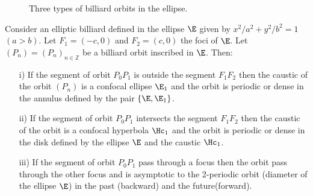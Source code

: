  \begin{figure}
	\begin{center}
		\def\svgwidth{1.0\textwidth}
		
		\caption{Three types of billiard orbits in the ellipse.}
	\end{center}
\label{fig:caustic1}
\end{figure} 
 
 \begin{theorem}
 Consider an  elliptic billiard defined  in the ellipse $\E$ given by $x^2/a^2+y^2/b^2=1$ $(a>b)$. Let $F_1=(-c,0)$ and $F_2=(c,0) $ the foci of $\E$. Let $(P_n)=(P_n)_{n\in\mathbb{Z}}$ be a billiard orbit inscribed in $\E$. Then:
 
 \begin{itemize} 
 \item[i)] If the segment of orbit $P_0P_1$ is outside the segment $F_1F_2$ then the caustic of the orbit $(P_n)$ is a confocal ellipse $\E_1$ and the orbit is periodic or dense in the annulus defined by the pair  $\{\E,   \E_1 \}$.
 
  \item[ii)] If the segment of orbit $P_0P_1$   intersects the segment $F_1F_2$ then the caustic of the orbit is a confocal hyperbola  $\Hc_1$ and the orbit is periodic or dense in the disk defined by the ellipse $\E$ and the caustic $\Hc_1$.
  
   \item[iii)] If the segment of orbit $P_0P_1$ pass through a focus  then the orbit pass through the other focus and is asymptotic to the 2-periodic orbit (diameter of the ellipse $\E$) in the past (backward) and  the future(forward).
\end{itemize}
\end{theorem}

